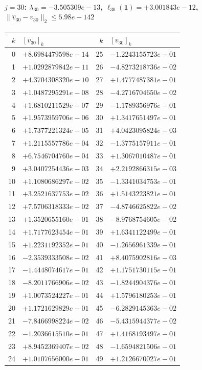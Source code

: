 \documentclass[11pt]{article}
\begin{document}
\paragraph{$j = 30$: $\lambda_{30} = -3.505309e-13$, \quad $\ell_{30}(\mathbf{1}) = +3.001843e-12$, \quad $\|\hat{v}_{30} - v_{30}\|_2 \leq 5.98e-142$}
\begin{center}
{\footnotesize
\begin{tabular}{r@{\;\;}l@{\quad}r@{\;\;}l}
\toprule
$k$ & $[v_{30}]_k$ & $k$ & $[v_{30}]_k$ \\
\midrule
0 & $+8.6984479598e-14$ & 25 & $-1.2243155723e-01$ \\
1 & $+1.0292879842e-11$ & 26 & $-4.8273218736e-02$ \\
2 & $+4.3704308320e-10$ & 27 & $+1.4777487381e-01$ \\
3 & $+1.0487295291e-08$ & 28 & $-4.2716704650e-02$ \\
4 & $+1.6810211529e-07$ & 29 & $-1.1789356976e-01$ \\
5 & $+1.9573959706e-06$ & 30 & $+1.3417651497e-01$ \\
6 & $+1.7377221324e-05$ & 31 & $+4.0423095824e-03$ \\
7 & $+1.2115557786e-04$ & 32 & $-1.3775157911e-01$ \\
8 & $+6.7546704760e-04$ & 33 & $+1.3067010487e-01$ \\
9 & $+3.0407254436e-03$ & 34 & $+2.2192866315e-03$ \\
10 & $+1.1080686297e-02$ & 35 & $-1.3341034753e-01$ \\
11 & $+3.2521637753e-02$ & 36 & $+1.5143223821e-01$ \\
12 & $+7.5706318333e-02$ & 37 & $-4.8746625822e-02$ \\
13 & $+1.3520655160e-01$ & 38 & $-8.9768754605e-02$ \\
14 & $+1.7177623454e-01$ & 39 & $+1.6341122499e-01$ \\
15 & $+1.2231192352e-01$ & 40 & $-1.2656961339e-01$ \\
16 & $-2.3539333508e-02$ & 41 & $+8.4075902816e-03$ \\
17 & $-1.4448074617e-01$ & 42 & $+1.1751730115e-01$ \\
18 & $-8.2011766906e-02$ & 43 & $-1.8244904376e-01$ \\
19 & $+1.0073524227e-01$ & 44 & $+1.5796180253e-01$ \\
20 & $+1.1721629829e-01$ & 45 & $-6.2829145363e-02$ \\
21 & $-7.8466998224e-02$ & 46 & $-5.4315944377e-02$ \\
22 & $-1.2036615510e-01$ & 47 & $+1.4168193497e-01$ \\
23 & $+8.9452369407e-02$ & 48 & $-1.6594821506e-01$ \\
24 & $+1.0107656000e-01$ & 49 & $+1.2126670027e-01$ \\
\bottomrule
\end{tabular}
}
\end{center}
\end{document}
